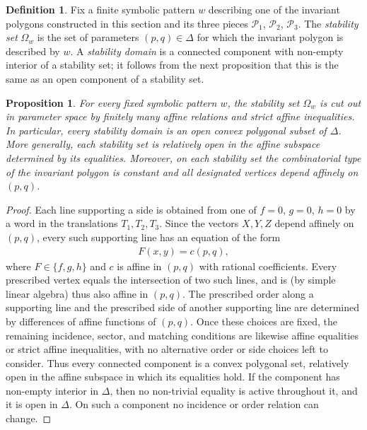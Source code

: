 \documentclass[11pt,reqno,tbtags,a4paper]{amsart}
\numberwithin{equation}{section}
\theoremstyle{plain}%
\newtheorem{proposition}[theorem]{Proposition}
\theoremstyle{definition}
\newtheorem{definition}[theorem]{Definition}
\theoremstyle{remark}
\newcommand\cP{\mathcal P}
\newcommand\0{{\boldsymbol 0}}
\newcommand\1{{\boldsymbol 1}}
\begin{document}
\begin{definition}\label{Dm3-realization}
Fix a finite symbolic pattern $w$ describing one of the invariant polygons
constructed in this section and its
three pieces
$\cP_1$, $\cP_2$, $\cP_3$.
The \emph{stability set} $\Omega_w$ 
is the set of parameters $(p,q)\in\Delta$
for which the invariant polygon is described by $w$.
%
%
A \emph{stability domain} is 
a connected component with non-empty interior of a stability set;
it follows from the next proposition
that this is the same as an open component of a stability set.
\end{definition}

\begin{proposition}\label{Pm3-realization}
For every fixed symbolic pattern $w$,
the stability set $\Omega_w$ is cut
out in parameter space by finitely many affine relations and strict affine
inequalities. 
In particular, every stability domain is an open convex polygonal subset of
$\Delta$.  More generally, each stability set is relatively open in the affine
subspace determined by its equalities.  Moreover, on each stability set the
combinatorial type of the invariant polygon is constant and all designated
vertices depend affinely on $(p,q)$.
\end{proposition}

\begin{proof}
Each line supporting a side is obtained from one of $f=0$, $g=0$, $h=0$ by a word
in the translations $T_1,T_2,T_3$. Since the vectors $X,Y,Z$ depend affinely
on $(p,q)$, every such supporting line has an equation of the form
\begin{align}
F(x,y)=c(p,q),
\end{align}
where $F\in\{f,g,h\}$ and $c$ is affine in $(p,q)$
with rational coefficients.
Every prescribed vertex equals the intersection of two such lines, and is
(by simple linear algebra)
thus also affine in $(p,q)$. The prescribed order along a supporting line
and the prescribed side of another supporting line are determined by
differences of affine functions of $(p,q)$. Once these choices are fixed,
the remaining incidence, sector, and matching conditions are likewise
affine equalities or strict affine inequalities, with no alternative order
or side choices left to consider. Thus every connected
component is a convex polygonal set, relatively open in the affine subspace in
which its equalities hold. If the component has non-empty interior in $\Delta$,
then no non-trivial equality is active throughout it, and it is open in
$\Delta$. On such a component no incidence or order relation can change.
\end{proof}
\end{document}
